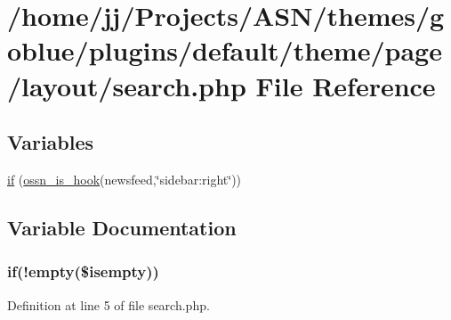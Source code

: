 \hypertarget{themes_2goblue_2plugins_2default_2theme_2page_2layout_2search_8php}{}\section{/home/jj/\+Projects/\+A\+S\+N/themes/goblue/plugins/default/theme/page/layout/search.php File Reference}
\label{themes_2goblue_2plugins_2default_2theme_2page_2layout_2search_8php}
\subsection*{Variables}
\begin{DoxyCompactItemize}
\item 
\hyperlink{themes_2goblue_2plugins_2default_2theme_2page_2layout_2search_8php_a9b5c96837e77b2b9e8f3507d92e1e99c}{if} (\hyperlink{ossn_8lib_8system_8php_ae29c30c131d7600928d7a2fc28bcd322}{ossn\+\_\+is\+\_\+hook}(\textquotesingle{}newsfeed\textquotesingle{},\char`\"{}sidebar\+:right\char`\"{}))
\end{DoxyCompactItemize}


\subsection{Variable Documentation}
\subsubsection[{\texorpdfstring{if}{if}}]{\setlength{\rightskip}{0pt plus 5cm}if(!empty(\$isempty))}\hypertarget{themes_2goblue_2plugins_2default_2theme_2page_2layout_2search_8php_a9b5c96837e77b2b9e8f3507d92e1e99c}{}\label{themes_2goblue_2plugins_2default_2theme_2page_2layout_2search_8php_a9b5c96837e77b2b9e8f3507d92e1e99c}


Definition at line 5 of file search.\+php.

